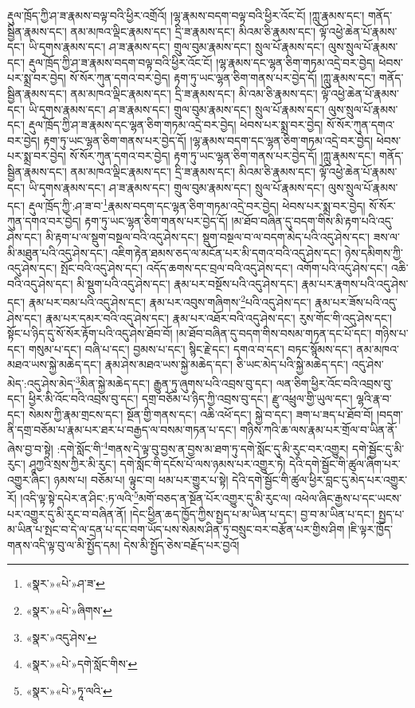 རྡུལ་ཁྲོད་ཀྱི་ཤ་ཟ་རྣམས་བལྟ་བའི་ཕྱིར་འགྲོའོ། །ལྷ་རྣམས་བདག་བལྟ་བའི་ཕྱིར་འོང་ངོ། །ཀླུ་རྣམས་དང་། གནོད་སྦྱིན་རྣམས་དང་། ནམ་མཁའ་ལྡིང་རྣམས་དང་། དྲི་ཟ་རྣམས་དང་། མིའམ་ཅི་རྣམས་དང་། ལྟོ་འཕྱེ་ཆེན་པོ་རྣམས་དང་། ཡི་དྭགས་རྣམས་དང་། ཤ་ཟ་རྣམས་དང་། གྲུལ་བུམ་རྣམས་དང་། སྲུལ་པོ་རྣམས་དང་། ལུས་སྲུལ་པོ་རྣམས་དང་། རྡུལ་ཁྲོད་ཀྱི་ཤ་ཟ་རྣམས་བདག་བལྟ་བའི་ཕྱིར་འོང་ངོ། །ལྷ་རྣམས་དང་ལྷན་ཅིག་གཏམ་འདྲེ་བར་བྱེད། ཕེབས་པར་སྨྲ་བར་བྱེད། སོ་སོར་ཀུན་དགའ་བར་བྱེད། རྟག་ཏུ་ཡང་ལྷན་ཅིག་གནས་པར་བྱེད་དོ། །ཀླུ་རྣམས་དང་། གནོད་སྦྱིན་རྣམས་དང་། ནམ་མཁའ་ལྡིང་རྣམས་དང་། དྲི་ཟ་རྣམས་དང་། མི་འམ་ཅི་རྣམས་དང་། ལྟོ་འཕྱེ་ཆེན་པོ་རྣམས་དང་། ཡི་དྭགས་རྣམས་དང་། ཤ་ཟ་རྣམས་དང་། གྲུལ་བུམ་རྣམས་དང་། སྲུལ་པོ་རྣམས་དང་། ལུས་སྲུལ་པོ་རྣམས་དང་། རྡུལ་ཁྲོད་ཀྱི་ཤ་ཟ་རྣམས་དང་ལྷན་ཅིག་གཏམ་འདྲེ་བར་བྱེད། ཕེབས་པར་སྨྲ་བར་བྱེད། སོ་སོར་ཀུན་དགའ་བར་བྱེད། རྟག་ཏུ་ཡང་ལྷན་ཅིག་གནས་པར་བྱེད་དོ། །ལྷ་རྣམས་བདག་དང་ལྷན་ཅིག་གཏམ་འདྲེ་བར་བྱེད། ཕེབས་པར་སྨྲ་བར་བྱེད། སོ་སོར་ཀུན་དགའ་བར་བྱེད། རྟག་ཏུ་ཡང་ལྷན་ཅིག་གནས་པར་བྱེད་དོ། །ཀླུ་རྣམས་དང་། གནོད་སྦྱིན་རྣམས་དང་། ནམ་མཁའ་ལྡིང་རྣམས་དང་། དྲི་ཟ་རྣམས་དང་། མིའམ་ཅི་རྣམས་དང་། ལྟོ་འཕྱེ་ཆེན་པོ་རྣམས་དང་། ཡི་དྭགས་རྣམས་དང་། ཤ་ཟ་རྣམས་དང་། གྲུལ་བུམ་རྣམས་དང་། སྲུལ་པོ་རྣམས་དང་། ལུས་སྲུལ་པོ་རྣམས་དང་། རྡུལ་ཁྲོད་ཀྱི་:ཤ་ཟ་བ་\footnote{«སྣར་»«པེ་»ཤ་ཟ་}རྣམས་བདག་དང་ལྷན་ཅིག་གཏམ་འདྲེ་བར་བྱེད། ཕེབས་པར་སྨྲ་བར་བྱེད། སོ་སོར་ཀུན་དགའ་བར་བྱེད། རྟག་ཏུ་ཡང་ལྷན་ཅིག་གནས་པར་བྱེད་དོ། །མ་ཐོབ་བཞིན་དུ་བདག་གིས་མི་རྟག་པའི་འདུ་ཤེས་དང་། མི་རྟག་པ་ལ་སྡུག་བསྔལ་བའི་འདུ་ཤེས་དང་། སྡུག་བསྔལ་བ་ལ་བདག་མེད་པའི་འདུ་ཤེས་དང་། ཟས་ལ་མི་མཐུན་པའི་འདུ་ཤེས་དང་། འཇིག་རྟེན་ཐམས་ཅད་ལ་མངོན་པར་མི་དགའ་བའི་འདུ་ཤེས་དང་། ཉེས་དམིགས་ཀྱི་འདུ་ཤེས་དང་། སྤོང་བའི་འདུ་ཤེས་དང་། འདོད་ཆགས་དང་བྲལ་བའི་འདུ་ཤེས་དང་། འགོག་པའི་འདུ་ཤེས་དང་། འཆི་བའི་འདུ་ཤེས་དང་། མི་སྡུག་པའི་འདུ་ཤེས་དང་། རྣམ་པར་བསྔོས་པའི་འདུ་ཤེས་དང་། རྣམ་པར་རྣགས་པའི་འདུ་ཤེས་དང་། རྣམ་པར་བམ་པའི་འདུ་ཤེས་དང་། རྣམ་པར་འབུས་གཞིགས་\footnote{«སྣར་»«པེ་»ཞིགས་}པའི་འདུ་ཤེས་དང་། རྣམ་པར་ཟོས་པའི་འདུ་ཤེས་དང་། རྣམ་པར་དམར་བའི་འདུ་ཤེས་དང་། རྣམ་པར་འཐོར་བའི་འདུ་ཤེས་དང་། རུས་གོང་གི་འདུ་ཤེས་དང་། སྟོང་པ་ཉིད་དུ་སོ་སོར་རྟོག་པའི་འདུ་ཤེས་ཐོབ་བོ། །མ་ཐོབ་བཞིན་དུ་བདག་གིས་བསམ་གཏན་དང་པོ་དང་། གཉིས་པ་དང་། གསུམ་པ་དང་། བཞི་པ་དང་། བྱམས་པ་དང་། སྙིང་རྗེ་དང་། དགའ་བ་དང་། བཏང་སྙོམས་དང་། ནམ་མཁའ་མཐའ་ཡས་སྐྱེ་མཆེད་དང་། རྣམ་ཤེས་མཐའ་ཡས་སྐྱེ་མཆེད་དང་། ཅི་ཡང་མེད་པའི་སྐྱེ་མཆེད་དང་། འདུ་ཤེས་མེད་:འདུ་ཤེས་མེད་\footnote{«སྣར་»འདུ་ཤེས་}མིན་སྐྱེ་མཆེད་དང་། རྒྱུན་ཏུ་ཞུགས་པའི་འབྲས་བུ་དང་། ལན་ཅིག་ཕྱིར་འོང་བའི་འབྲས་བུ་དང་། ཕྱིར་མི་འོང་བའི་འབྲས་བུ་དང་། དགྲ་བཅོམ་པ་ཉིད་ཀྱི་འབྲས་བུ་དང་། རྫུ་འཕྲུལ་གྱི་ཡུལ་དང་། ལྷའི་རྣ་བ་དང་། སེམས་ཀྱི་རྣམ་གྲངས་དང་། སྔོན་གྱི་གནས་དང་། འཆི་འཕོ་དང་། སྐྱེ་བ་དང་། ཟག་པ་ཟད་པ་ཐོབ་བོ། །བདག་ནི་དགྲ་བཅོམ་པ་རྣམ་པར་ཐར་པ་བརྒྱད་ལ་བསམ་གཏན་པ་དང་། གཉིས་ཀའི་ཆ་ལས་རྣམ་པར་གྲོལ་བ་ཡིན་ནོ་ཞེས་བྱ་བ་སྟེ། :དགེ་སློང་གི་\footnote{«སྣར་»«པེ་»དགེ་སློང་གིས་}གནས་དེ་ལྟ་བུ་བྱས་ན་བྱས་མ་ཐག་ཏུ་དགེ་སློང་དུ་མི་རུང་བར་འགྱུར། དགེ་སྦྱོང་དུ་མི་རུང་། ཤཱཀྱའི་སྲས་ཀྱིར་མི་རུང་། དགེ་སློང་གི་དངོས་པོ་ལས་ཉམས་པར་འགྱུར་ཏེ། དེའི་དགེ་སྦྱོང་གི་ཚུལ་ཞིག་པར་འགྱུར་ཞིང་། ཉམས་པ། བཅོམ་པ། ལྟུང་བ། ཕམ་པར་གྱུར་པ་སྟེ། དེའི་དགེ་སྦྱོང་གི་ཚུལ་ཕྱིར་བླང་དུ་མེད་པར་འགྱུར་རོ། །འདི་ལྟ་སྟེ་དཔེར་ན་ཤིང་:ཏ་ལའི་\footnote{«སྣར་»«པེ་»ཏཱ་ལའི་}མགོ་བཅད་ན་སྔོན་པོར་འགྱུར་དུ་མི་རུང་ལ། འཕེལ་ཞིང་རྒྱས་པ་དང་ཡངས་པར་འགྱུར་དུ་མི་རུང་བ་བཞིན་ནོ། །དེང་ཕྱིན་ཆད་ཁྱོད་ཀྱིས་སྤྱད་པ་མ་ཡིན་པ་དང་། བྱ་བ་མ་ཡིན་པ་དང་། སྤྱད་པ་མ་ཡིན་པ་སྤང་བ་དེ་ལ་དྲན་པ་དང་བག་ཡོད་པས་སེམས་ཤིན་ཏུ་བསྲུང་བར་བརྩོན་པར་གྱིས་ཤིག །ཇི་ལྟར་ཁྱོད་གནས་འདི་ལྟ་བུ་ལ་མི་སྤྱོད་དམ། དེས་མི་སྤྱོད་ཅེས་བརྗོད་པར་བྱའོ། 